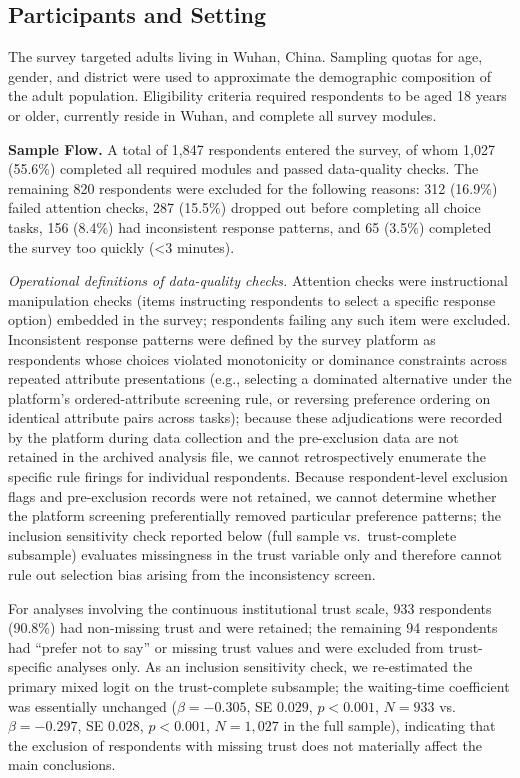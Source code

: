 \documentclass[12pt]{article}
\begin{document}
\subsection{Participants and Setting}

The survey targeted adults living in Wuhan, China. Sampling quotas for age, gender, and district were used to approximate the demographic composition of the adult population. Eligibility criteria required respondents to be aged 18 years or older, currently reside in Wuhan, and complete all survey modules. 

\textbf{Sample Flow.} A total of 1,847 respondents entered the survey, of whom 1,027 (55.6\%) completed all required modules and passed data-quality checks. The remaining 820 respondents were excluded for the following reasons: 312 (16.9\%) failed attention checks, 287 (15.5\%) dropped out before completing all choice tasks, 156 (8.4\%) had inconsistent response patterns, and 65 (3.5\%) completed the survey too quickly (\textless 3 minutes).

\textit{Operational definitions of data-quality checks.} Attention checks were instructional manipulation checks (items instructing respondents to select a specific response option) embedded in the survey; respondents failing any such item were excluded. Inconsistent response patterns were defined by the survey platform as respondents whose choices violated monotonicity or dominance constraints across repeated attribute presentations (e.g., selecting a dominated alternative under the platform's ordered-attribute screening rule, or reversing preference ordering on identical attribute pairs across tasks); because these adjudications were recorded by the platform during data collection and the pre-exclusion data are not retained in the archived analysis file, we cannot retrospectively enumerate the specific rule firings for individual respondents. Because respondent-level exclusion flags and pre-exclusion records were not retained, we cannot determine whether the platform screening preferentially removed particular preference patterns; the inclusion sensitivity check reported below (full sample vs.\ trust-complete subsample) evaluates missingness in the trust variable only and therefore cannot rule out selection bias arising from the inconsistency screen.

For analyses involving the continuous institutional trust scale, 933 respondents (90.8\%) had non-missing trust and were retained; the remaining 94 respondents had ``prefer not to say'' or missing trust values and were excluded from trust-specific analyses only. As an inclusion sensitivity check, we re-estimated the primary mixed logit on the trust-complete subsample; the waiting-time coefficient was essentially unchanged ($\beta = -0.305$, SE $0.029$, $p < 0.001$, $N = 933$ vs.\\ $\beta = -0.297$, SE $0.028$, $p < 0.001$, $N = 1{,}027$ in the full sample), indicating that the exclusion of respondents with missing trust does not materially affect the main conclusions.
\end{document}
